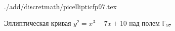 \begin{figure}
\centering
 {./add/discretmath/picellipticfp97.tex}
\caption{Эллиптическая кривая $y^2 = x^3 -7 x + 10$ над полем
  $\mathbb{F}_{97}$}
\label{fig:add:ellipticFp97}
\end{figure}

